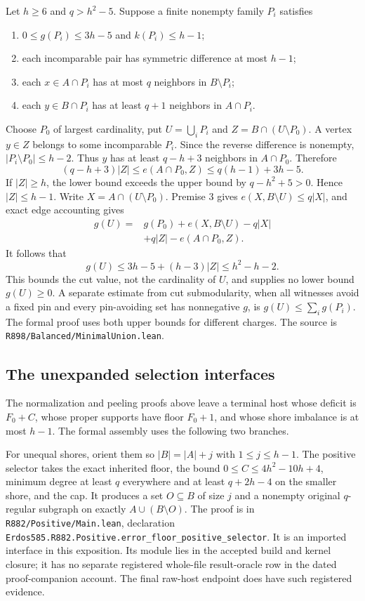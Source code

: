 \documentclass[11pt]{article}
\begin{document}
Let $h\ge6$ and $q>h^2-5$. Suppose a finite nonempty family $P_i$ satisfies
\begin{enumerate}
\item $0\le g(P_i)\le3h-5$ and $k(P_i)\le h-1$;
\item each incomparable pair has symmetric difference at most $h-1$;
\item each $x\in A\cap P_i$ has at most $q$ neighbors in $B\setminus P_i$;
\item each $y\in B\cap P_i$ has at least $q+1$ neighbors in $A\cap P_i$.
\end{enumerate}
Choose $P_0$ of largest cardinality, put $U=\bigcup_iP_i$ and $Z=B\cap(U\setminus P_0)$. A vertex $y\in Z$ belongs to some incomparable $P_i$. Since the reverse difference is nonempty, $|P_i\setminus P_0|\le h-2$. Thus $y$ has at least $q-h+3$ neighbors in $A\cap P_0$. Therefore
\[
 (q-h+3)|Z|\le e(A\cap P_0,Z)
 \le q(h-1)+3h-5.
\]
If $|Z|\ge h$, the lower bound exceeds the upper bound by $q-h^2+5>0$. Hence $|Z|\le h-1$. Write $X=A\cap(U\setminus P_0)$. Premise 3 gives $e(X,B\setminus U)\le q|X|$, and exact edge accounting gives
\begin{align*}
 g(U)={}&g(P_0)+e(X,B\setminus U)-q|X|\\
       &+q|Z|-e(A\cap P_0,Z).
\end{align*}
It follows that
\[
 g(U)\le3h-5+(h-3)|Z|\le h^2-h-2.
\]
This bounds the cut value, not the cardinality of $U$, and supplies no lower bound $g(U)\ge0$. A separate estimate from cut submodularity, when all witnesses avoid a fixed pin and every pin-avoiding set has nonnegative $g$, is $g(U)\le\sum_i g(P_i)$. The formal proof uses both upper bounds for different charges. The source is \nolinkurl{R898/Balanced/MinimalUnion.lean}.

\subsection{The unexpanded selection interfaces}
The normalization and peeling proofs above leave a terminal host whose deficit is $F_0+C$, whose proper supports have floor $F_0+1$, and whose shore imbalance is at most $h-1$. The formal assembly uses the following two branches.

For unequal shores, orient them so $|B|=|A|+j$ with $1\le j\le h-1$. The positive selector takes the exact inherited floor, the bound $0\le C\le4h^2-10h+4$, minimum degree at least $q$ everywhere and at least $q+2h-4$ on the smaller shore, and the cap. It produces a set $O\subseteq B$ of size $j$ and a nonempty original $q$-regular subgraph on exactly $A\cup(B\setminus O)$. The proof is in \nolinkurl{R882/Positive/Main.lean}, declaration \nolinkurl{Erdos585.R882.Positive.error_floor_positive_selector}. It is an imported interface in this exposition. Its module lies in the accepted build and kernel closure; it has no separate registered whole-file result-oracle row in the dated proof-companion account. The final raw-host endpoint does have such registered evidence.
\end{document}
